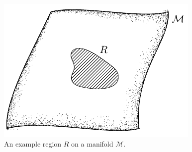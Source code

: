 \begin{figure}[htp]
	\centering
	\includegraphics{create_example_region_manifold.pdf}
	\caption{
		An example region \(R\) on a manifold \(\mathcal{M}\).
	}\label{fig:chapter4_region}
\end{figure}
